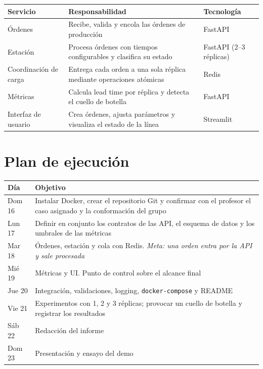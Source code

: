 \documentclass[11pt,a4paper]{article}
\begin{document}
\vspace{-6pt}
\begin{table}[H]
\centering\footnotesize
\begin{tabular}{@{}L{3.0cm} L{8.4cm} L{3.3cm}@{}}
\toprule
\textbf{Servicio} & \textbf{Responsabilidad} & \textbf{Tecnología} \\
\midrule
Órdenes & Recibe, valida y encola las órdenes de producción & FastAPI \\
Estación & Procesa órdenes con tiempos configurables y clasifica su estado & FastAPI (2--3 réplicas) \\
Coordinación de carga & Entrega cada orden a una sola réplica mediante operaciones atómicas & Redis \\
Métricas & Calcula lead time por réplica y detecta el cuello de botella & FastAPI \\
Interfaz de usuario & Crea órdenes, ajusta parámetros y visualiza el estado de la línea & Streamlit \\
\bottomrule
\end{tabular}
\end{table}

\section{Plan de ejecución}

\vspace{-3pt}
\begin{table}[H]
\centering\footnotesize
\begin{tabular}{@{}L{2.1cm} L{13.1cm}@{}}
\toprule
\textbf{Día} & \textbf{Objetivo} \\
\midrule
Dom 16 & Instalar Docker, crear el repositorio Git y confirmar con el profesor el caso asignado y la conformación del grupo \\
Lun 17 & Definir en conjunto los contratos de las API, el esquema de datos y los umbrales de las métricas \\
Mar 18 & Órdenes, estación y cola con Redis. \textit{Meta: una orden entra por la API y sale procesada} \\
Mié 19 & Métricas y UI. Punto de control sobre el alcance final \\
Jue 20 & Integración, validaciones, logging, \texttt{docker-compose} y README \\
Vie 21 & Experimentos con 1, 2 y 3 réplicas; provocar un cuello de botella y registrar los resultados \\
Sáb 22 & Redacción del informe \\
Dom 23 & Presentación y ensayo del demo \\
\bottomrule
\end{tabular}
\end{table}
\end{document}

